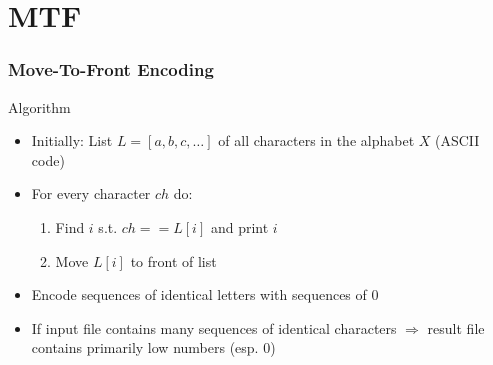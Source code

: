 \section{MTF}

\begin{frame}
	\frametitle{Move-To-Front Encoding}
	\begin{block}{Algorithm}
		\begin{itemize}
			\item Initially: List $L=[a,b,c,\ldots]$ of all characters in the alphabet $X$ (ASCII code)
			\item For every character $ch$ do:
			\begin{enumerate}
				\item Find $i$ s.t. $ch==L[i]$ and print $i$
				\item Move $L[i]$ to front of list
			\end{enumerate}
		\end{itemize}
	\end{block}
	\begin{itemize}
		\item Encode sequences of identical letters with sequences of $0$
		\item If input file contains many sequences of identical characters $\Rightarrow$ result file contains primarily low numbers (esp. 0)
	\end{itemize}
\end{frame}
